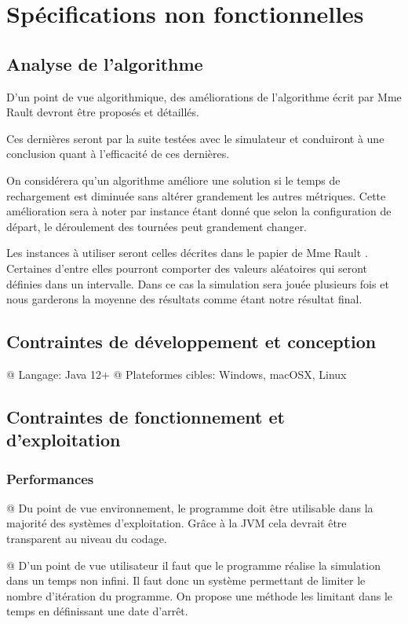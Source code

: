 \documentclass[final]{polytech/polytech}
\begin{document}
\chapter{Spécifications non fonctionnelles}
	\section{Analyse de l'algorithme}
		D'un point de vue algorithmique, des améliorations de l'algorithme écrit par Mme Rault \cite{Rault:chargers} devront être proposés et détaillés.
			
		Ces dernières seront par la suite testées avec le simulateur et conduiront à une conclusion quant à l'efficacité de ces dernières.
		
		On considérera qu'un algorithme améliore une solution si le temps de rechargement est diminuée sans altérer grandement les autres métriques.
		Cette amélioration sera à noter par instance étant donné que selon la configuration de départ, le déroulement des tournées peut grandement changer.
		
		Les instances à utiliser seront celles décrites dans le papier de Mme Rault \cite{Rault:chargers}.
		Certaines d'entre elles pourront comporter des valeurs aléatoires qui seront définies dans un intervalle.
		Dans ce cas la simulation sera jouée plusieurs fois et nous garderons la moyenne des résultats comme étant notre résultat final.

	\section{Contraintes de développement et conception}
		\begin{easylist}[itemize]
			@ Langage: Java 12+
			@ Plateformes cibles: Windows, macOSX, Linux
		\end{easylist}
		
	\section{Contraintes de fonctionnement et d'exploitation}
		\subsection{Performances}
			\begin{easylist}
				@ Du point de vue environnement, le programme doit être utilisable dans la majorité des systèmes d'exploitation.
				Grâce à la JVM cela devrait être transparent au niveau du codage.
			
				@ D'un point de vue utilisateur il faut que le programme réalise la simulation dans un temps non infini.
				Il faut donc un système permettant de limiter le nombre d'itération du programme.
				On propose une méthode les limitant dans le temps en définissant une date d'arrêt.
			\end{easylist}
			
\end{document}
